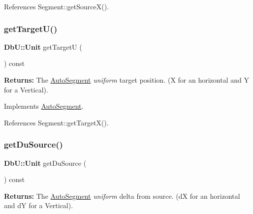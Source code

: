 References Segment\+::get\+Source\+X().

\mbox{\label{classKatabatic_1_1AutoHorizontal_a4d52a506cd19dfa8e22e1dc0695bd960}} 
\subsubsection{\texorpdfstring{get\+Target\+U()}{getTargetU()}}
{\footnotesize\ttfamily \textbf{ Db\+U\+::\+Unit} get\+TargetU (\begin{DoxyParamCaption}{ }\end{DoxyParamCaption}) const\hspace{0.3cm}{\ttfamily [virtual]}}

{\bfseries Returns\+:} The \mbox{\hyperlink{classKatabatic_1_1AutoSegment}{Auto\+Segment}} {\itshape uniform} target position. (X for an horizontal and Y for a Vertical). 

Implements \mbox{\hyperlink{classKatabatic_1_1AutoSegment_a828fef2716cc9c370d6d170bb96556ec}{Auto\+Segment}}.



References Segment\+::get\+Target\+X().

\mbox{\label{classKatabatic_1_1AutoHorizontal_a760500b1fd027c71f5362dd8c0b01ea7}} 
\subsubsection{\texorpdfstring{get\+Du\+Source()}{getDuSource()}}
{\footnotesize\ttfamily \textbf{ Db\+U\+::\+Unit} get\+Du\+Source (\begin{DoxyParamCaption}{ }\end{DoxyParamCaption}) const\hspace{0.3cm}{\ttfamily [virtual]}}

{\bfseries Returns\+:} The \mbox{\hyperlink{classKatabatic_1_1AutoSegment}{Auto\+Segment}} {\itshape uniform} delta from source. (dX for an horizontal and dY for a Vertical). 

